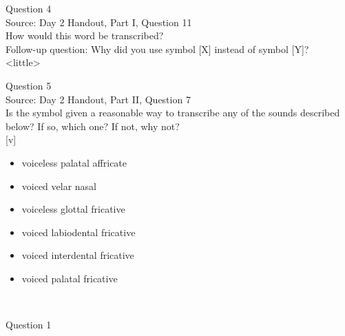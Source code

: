 \documentclass[12pt]{article}
\begin{document}
\newpage

{\large Question 4}\\

Source: Day 2 Handout, Part I, Question 11\\

How would this word be transcribed?\\ Follow-up question: Why did you use symbol [X] instead of symbol [Y]?\\

<little>


\newpage

{\large Question 5}\\

Source: Day 2 Handout, Part II, Question 7\\

Is the symbol given a reasonable way to transcribe any of the sounds described below? If so, which one? If not, why not?\\

{[v]}

\begin{itemize} \item voiceless palatal affricate \item voiced velar nasal \item voiceless glottal fricative \item voiced labiodental fricative \item voiced interdental fricative \item voiced palatal fricative \end{itemize}


\newpage

\begin{center}
\textbf{{\color{red}{\HUGE END OF EXAM}}}\\

\end{center}
\newpage

\begin{center}
\textbf{{\color{blue}{\HUGE START OF EXAM\\}}}

\textbf{{\color{blue}{\HUGE Student ID: 8350\\}}}

\textbf{{\color{blue}{\HUGE 3:45 - 4:00 PM\\}}}

\end{center}
\newpage

{\large Question 1}\\
\end{document}
